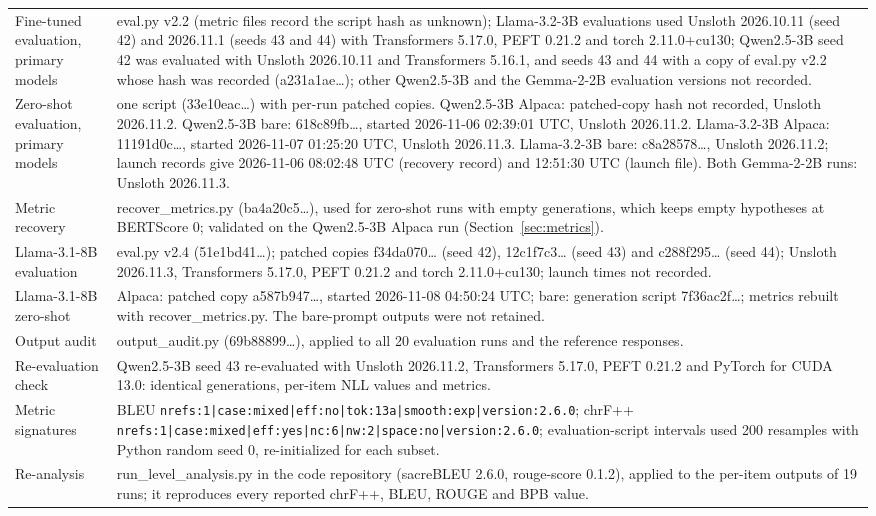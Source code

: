 \documentclass{article}
\begin{document}
\begin{table}[H]
\begin{tabular}{@{}L{123.2pt}L{334.5pt}@{}}
Fine-tuned evaluation, primary models & eval.py v2.2 (metric files record the script hash as unknown); Llama-3.2-3B evaluations used Unsloth 2026.10.11 (seed 42) and 2026.11.1 (seeds 43 and 44) with Transformers 5.17.0, PEFT 0.21.2 and torch 2.11.0+cu130; Qwen2.5-3B seed 42 was evaluated with Unsloth 2026.10.11 and Transformers 5.16.1, and seeds 43 and 44 with a copy of eval.py v2.2 whose hash was recorded (a231a1ae\ldots{}); other Qwen2.5-3B and the Gemma-2-2B evaluation versions not recorded. \\
Zero-shot evaluation, primary models & one script (33e10eac\ldots{}) with per-run patched copies. Qwen2.5-3B Alpaca: patched-copy hash not recorded, Unsloth 2026.11.2. Qwen2.5-3B bare: 618c89fb\ldots{}, started 2026-11-06 02:39:01 UTC, Unsloth 2026.11.2. Llama-3.2-3B Alpaca: 11191d0c\ldots{}, started 2026-11-07 01:25:20 UTC, Unsloth 2026.11.3. Llama-3.2-3B bare: c8a28578\ldots{}, Unsloth 2026.11.2; launch records give 2026-11-06 08:02:48 UTC (recovery record) and 12:51:30 UTC (launch file). Both Gemma-2-2B runs: Unsloth 2026.11.3. \\
Metric recovery & recover\_metrics.py (ba4a20c5\ldots{}), used for zero-shot runs with empty generations, which keeps empty hypotheses at BERTScore 0; validated on the Qwen2.5-3B Alpaca run (Section~\ref{sec:metrics}). \\
Llama-3.1-8B evaluation & eval.py v2.4 (51e1bd41\ldots{}); patched copies f34da070\ldots{} (seed 42), 12c1f7c3\ldots{} (seed 43) and c288f295\ldots{} (seed 44); Unsloth 2026.11.3, Transformers 5.17.0, PEFT 0.21.2 and torch 2.11.0+cu130; launch times not recorded. \\
Llama-3.1-8B zero-shot & Alpaca: patched copy a587b947\ldots{}, started 2026-11-08 04:50:24 UTC; bare: generation script 7f36ac2f\ldots{}; metrics rebuilt with recover\_metrics.py. The bare-prompt outputs were not retained. \\
Output audit & output\_audit.py (69b88899\ldots{}), applied to all 20 evaluation runs and the reference responses. \\
Re-evaluation check & Qwen2.5-3B seed 43 re-evaluated with Unsloth 2026.11.2, Transformers 5.17.0, PEFT 0.21.2 and PyTorch for CUDA 13.0: identical generations, per-item NLL values and metrics. \\
Metric signatures & BLEU \texttt{nrefs:1|case:mixed|eff:no|tok:13a|smooth:exp|version:2.6.0}; chrF++ \texttt{nrefs:1|case:mixed|eff:yes|nc:6|nw:2|space:no|version:2.6.0}; evaluation-script intervals used 200 resamples with Python random seed 0, re-initialized for each subset. \\
Re-analysis & run\_level\_analysis.py in the code repository (sacreBLEU 2.6.0, rouge-score 0.1.2), applied to the per-item outputs of 19 runs; it reproduces every reported chrF++, BLEU, ROUGE and BPB value. \\
\bottomrule
\end{tabular}
\end{table}
\end{document}
